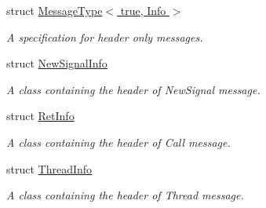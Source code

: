 \begin{DoxyCompactItemize}
struct \hyperlink{struct_message_1_1_message_type_3_01true_00_01_info_01_4}{Message\+Type$<$ true, Info $>$}
\begin{DoxyCompactList}\small\item\em A specification for header only messages. \end{DoxyCompactList}\item 
struct \hyperlink{struct_message_1_1_new_signal_info}{New\+Signal\+Info}
\begin{DoxyCompactList}\small\item\em A class containing the header of New\+Signal message. \end{DoxyCompactList}\item 
struct \hyperlink{struct_message_1_1_ret_info}{Ret\+Info}
\begin{DoxyCompactList}\small\item\em A class containing the header of Call message. \end{DoxyCompactList}\item 
struct \hyperlink{struct_message_1_1_thread_info}{Thread\+Info}
\begin{DoxyCompactList}\small\item\em A class containing the header of Thread message. \end{DoxyCompactList}\end{DoxyCompactItemize}
